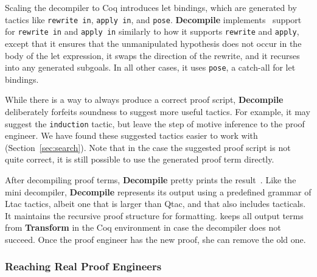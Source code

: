 Scaling the decompiler to Coq introduces let bindings, which are generated by 
tactics like \lstinline{rewrite in}, \lstinline{apply in}, and \lstinline{pose}.
\textbf{Decompile} implements~\href{https://github.com/uwplse/coq-plugin-lib/blob/9ef05815c261de9c99b604c6b581ba1c4fbc1a46/src/coq/decompiler/decompiler.ml}{} %
support for \lstinline{rewrite in} and \lstinline{apply in} similarly to how it supports
\lstinline{rewrite} and \lstinline{apply}, except that it ensures that the unmanipulated hypothesis does not occur in the body of the let expression,
it swaps the direction of the rewrite, and it recurses into any generated subgoals.
In all other cases, it uses \lstinline{pose}, a catch-all for let bindings.

While there is a way to always produce a correct proof script,
\textbf{Decompile} deliberately forfeits soundness to suggest more useful tactics.
For example, it may suggest the \lstinline{induction} tactic, but leave the step of motive inference to the proof engineer.
We have found these suggested tactics easier to work with (Section~\ref{sec:search}).
Note that in the case the suggested proof script is not quite correct,
it is still possible to use the generated proof term directly.

After decompiling proof terms, \textbf{Decompile} pretty prints the result~\href{https://github.com/uwplse/coq-plugin-lib/blob/9ef05815c261de9c99b604c6b581ba1c4fbc1a46/src/coq/decompiler/decompiler.ml}{}.
Like the mini decompiler, \textbf{Decompile} represents its output using a predefined grammar of Ltac tactics,
albeit one that is larger than Qtac, and that also includes tacticals.
It maintains the recursive proof structure for formatting. %
\toolnamec keeps all output terms from \textbf{Transform} in the Coq environment in case the decompiler does not succeed.
Once the proof engineer has the new proof, she can remove the old one.

\subsubsection{Reaching Real Proof Engineers}


